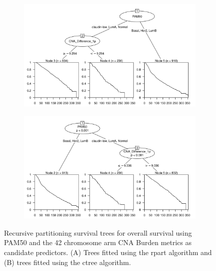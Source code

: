 \begin{figure}[!htb]
\centering

\vspace{0.5cm}

\begin{subfigure}{\textwidth}
\subcaption{}
\includegraphics[width=1\textwidth]{../figures/Appendices/Appendix_B/PA_PartyKit_Survival_Burden_OS_PAM50.png}
\end{subfigure}

\vspace{2cm}

\begin{subfigure}{\textwidth}
\subcaption{}
\includegraphics[width=1\textwidth]{../figures/Appendices/Appendix_B/PA_Ctree_Survival_Burden_OS_PAM50.png}
\end{subfigure}

\vspace{0.5cm}

\caption[Recursive partitioning survival trees for overall survival using PAM50 and the 42 chromosome arm CNA Burden metrics as candidate predictors.]{Recursive partitioning survival trees for overall survival using PAM50 and the 42 chromosome arm CNA Burden metrics as candidate predictors. (A) Trees fitted using the rpart algorithm and (B) trees fitted using the ctree algorithm.}
\end{figure}

